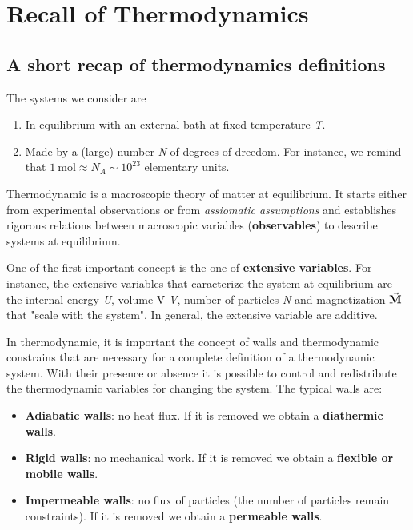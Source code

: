 \documentclass[../main/main.tex]{subfiles}
\begin{document}
\chapter{Recall of Thermodynamics}


\section{A short recap of thermodynamics definitions}
\noindent The systems we consider are

\begin{enumerate}
\item In equilibrium with an external bath at fixed temperature \emph{T}.
\item Made by a (large) number \emph{N} of degrees of dreedom. For instance, we remind that \( \SI{1}{\mole} \approx N_A \sim 10^{23}\) elementary units.
\end{enumerate}

\noindent Thermodynamic is a macroscopic theory of matter at equilibrium.
It starts either from experimental observations or from \emph{assiomatic assumptions} and establishes rigorous relations between macroscopic variables (\textbf{observables}) to describe systems at equilibrium.

One of the first important concept is the one of \textbf{extensive variables}. For instance, the extensive variables that caracterize the system at equilibrium are the internal energy \emph{U}, volume V \emph{V}, number of particles \emph{N} and magnetization \( \va{M} \) that "scale with the system".
In general, the extensive variable are additive.

In thermodynamic, it is important the concept of walls and thermodynamic constrains that are necessary for a complete definition of a thermodynamic system. With their presence or absence it is possible to control and redistribute the thermodynamic variables for changing the system.
The typical walls are:
\begin{itemize}
\item \textbf{Adiabatic walls}: no heat flux. If it is removed we obtain a \textbf{diathermic walls}.
\item \textbf{Rigid walls}: no mechanical work. If it is removed we obtain a \textbf{flexible or mobile walls}.
\item \textbf{Impermeable walls}: no flux of particles (the number of particles remain constraints). If it is removed we obtain a \textbf{permeable walls}.
\end{itemize}
\end{document}
